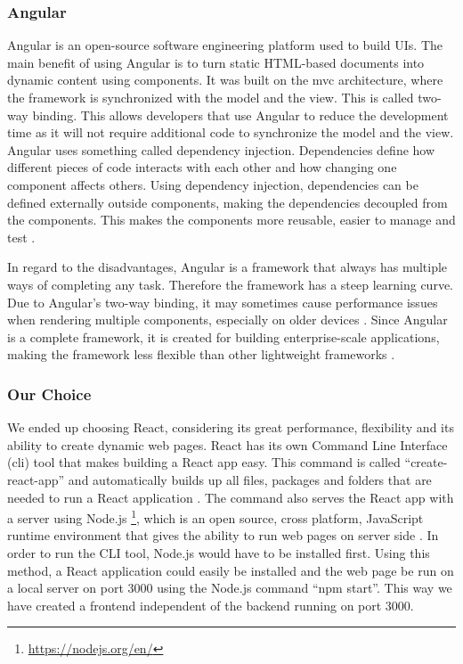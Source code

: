 \subsubsection{Angular}
Angular is an open-source software engineering platform used to build UIs. The main benefit of using Angular is to turn static HTML-based documents into dynamic content using components. It was built on the \acrlong{mvc} architecture, where the framework is synchronized with the model and the view. This is called two-way binding. This allows developers that use Angular to reduce the development time as it will not require additional code to synchronize the model and the view. Angular uses something called dependency injection. Dependencies define how different pieces of code interacts with each other and how changing one component affects others. Using dependency injection, dependencies can be defined externally outside components, making the dependencies decoupled from the components. This makes the components more reusable, easier to manage and test \cite{goodBadAngular}.

In regard to the disadvantages, Angular is a framework that always has multiple ways of completing any task. Therefore the framework has a steep learning curve. Due to Angular's two-way binding, it may sometimes cause performance issues when rendering multiple components, especially on older devices \cite{AngularCons}. Since Angular is a complete framework, it is created for building enterprise-scale applications, making the framework less flexible than other lightweight frameworks \cite{goodBadAngular}.

\subsubsection{Our Choice}
We ended up choosing React, considering its great performance, flexibility and its ability to create dynamic web pages. React has its own Command Line Interface (\acrshort{cli}) tool that makes building a React app easy. This command is called ``create-react-app'' and automatically builds up all files, packages and folders that are needed to run a React application \cite{ReactGetStarted}. The command also serves the React app with a server using Node.js \footnote{\url{https://nodejs.org/en/}}, which is an open source, cross platform, JavaScript runtime environment that gives the ability to run web pages on server side \cite{NodeJs}. In order to run the CLI tool, Node.js would have to be installed first. Using this method, a React application could easily be installed and the web page be run on a local server on port 3000 using the Node.js command ``npm start''. This way we have created a frontend independent of the backend running on port 3000.  

